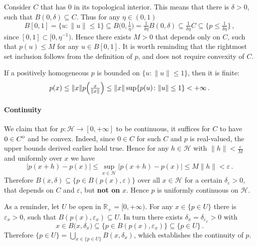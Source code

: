 \documentclass[a4paper]{article}
\newcommand{\Hcal}{\mathcal{H}}
\newcommand{\real}{\mathbb{R}}
\newcommand{\interior}[1]{%
  {\kern0pt#1}^{\mathrm{o}}%
}
\newcommand{\Tcal}{\mathcal{T}}
\begin{document}
Consider $C$ that has $0$ in its topological interior. This means that there is $\delta
> 0$, such that $B(0, \delta) \subseteq C$. Thus for any $\eta \in (0, 1)$
\begin{equation*}
  B[0, 1]
    = \{u\colon \|u\| \leq 1\}
    \subseteq B\bigl( 0, \tfrac1\eta \bigr)
    = \tfrac1{\delta \eta} B(0, \delta)
    \subseteq \tfrac1{\delta \eta} C
    \subseteq \bigl\{p \leq \tfrac1{\delta\eta} \bigr\}
    \,,
\end{equation*}
since $[0, 1] \subset [0, \eta^{-1})$. Hence there exists $M > 0$ that depends only
on $C$, such that $p(u) \leq M$ for any $u \in B[0, 1]$. It is worth reminding that
the rightmost set inclusion follows from the definition of $p$, and does not require
convexity of $C$.

If a positively homogeneous $p$ is bounded on $\{u\colon \|u\|\leq 1\}$, then it
is finite:
\begin{equation*}
  p(x)
    \leq \|x\| p\Bigl(\tfrac{x}{\|x\|}\Bigr)
    \leq \|x\| \sup\{p(u)\colon \|u\|\leq 1\}
    < +\infty
    \,.
\end{equation*}


\paragraph{Continuity} %
\label{par:continuity}

We claim that for $p\colon \Hcal \to [0, +\infty]$ to be continuous, it suffices
for $C$ to have $0\in \interior{C}$ and be convex. Indeed, since $0\in C$ for such
$C$ and $p$ is real-valued, the upper bounds derived earlier hold true. Hence for
any $h \in \Hcal$ with $\|h\| < \tfrac\varepsilon{M}$ and uniformly over $x$ we have
\begin{equation*}
  \bigl\lvert p(x + h) - p(x) \bigr\rvert
    \leq
      \sup_{x\in \Hcal}
        \bigl\lvert p(x + h) - p(x) \bigr\rvert
    \leq M \| h \| < \varepsilon
      \,.
\end{equation*}
Therefore $B(x, \delta) \subseteq \bigl\{ p\in B(p(x), \varepsilon)\bigr\}$ over
all $x\in \Hcal$ for a certain $\delta_\varepsilon > 0$, that depends on $C$ and
$\varepsilon$, but {\bf not on} $x$. Hence $p$ is uniformly continuous on $\Hcal$.

As a reminder, let $U$ be open in $\real_+ = [0, +\infty)$. For any $x\in \{p\in U\}$
there is $\varepsilon_x > 0$, such that $B(p(x), \varepsilon_x) \subseteq U$. In
turn there exists $\delta_x = \delta_{\varepsilon_x} > 0$ with
\begin{equation*}
  x \in B\bigl(x, \delta_x\bigr)
    \subseteq \bigl\{ p\in B(p(x), \varepsilon_x)\bigr\}
    \subseteq \{ p \in U \}
    \,.
\end{equation*}
Therefore $\{ p \in U \} = \bigcup_{x\in \{ p \in U \}} B(x, \delta_x)$, which
establishes the continuity of $p$.
\end{document}
